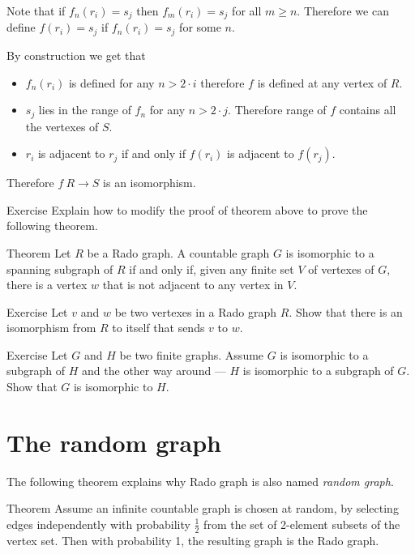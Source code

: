 Note that if $f_n(r_i)=s_j$ then $f_m(r_i)=s_j$ for all $m\ge n$.
Therefore we can define $f(r_i)=s_j$ if $f_n(r_i)=s_j$ for some $n$.


By construction we get that 
\begin{itemize}
\item $f_n(r_i)$ is defined for any $n>2\cdot i$ therefore $f$ is defined at any vertex of $R$.
\item $s_j$ lies in the range of $f_n$ for any $n>2\cdot j$.
Therefore range of $f$ contains all the vertexes of $S$.
\item $r_i$ is adjacent to $r_j$ if and only if $f(r_i)$ is adjacent to $f(r_j)$.
\end{itemize}
Therefore $f\:R\to S$ is an isomorphism.
\qeds

\begin{thm}{Exercise}
Explain how to modify the proof of theorem above to prove the following theorem.
\end{thm}


\begin{thm}{Theorem}
Let $R$ be a Rado graph.
A countable graph $G$ is isomorphic to a spanning subgraph of $R$ if and only if, given any finite set $V$ of vertexes of $G$, there is a vertex $w$ that is not adjacent to any vertex in $V$.
\end{thm}

\begin{thm}{Exercise}
Let $v$ and $w$ be two vertexes in a Rado graph $R$.
Show that there is an isomorphism from $R$ to itself that sends $v$ to $w$.
\end{thm}

\begin{thm}{Exercise}\label{ex:finite-subgraphs}
Let $G$ and $H$ be two finite graphs.
Assume $G$ is isomorphic to a subgraph of $H$ 
and the other way around --- $H$ is isomorphic to a subgraph of $G$.
Show that $G$ is isomorphic to $H$.
\end{thm}


\section*{The random graph}

The following theorem explains why Rado graph is also named {}\emph{random graph}.

\begin{thm}{Theorem}\label{thm:the-random-graph}
Assume an infinite countable graph is chosen at random, by selecting edges independently with probability $\tfrac12$ from the set of 2-element subsets of the vertex set.
Then with probability 1, the resulting graph is the Rado graph.
\end{thm}

